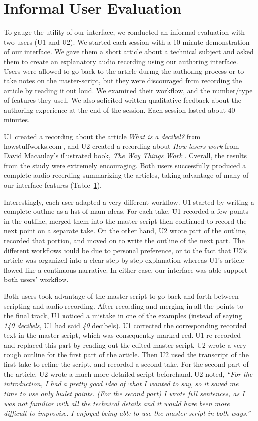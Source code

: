 \section{Informal User Evaluation}

To gauge the utility of our interface, we conducted an informal evaluation with two users (U1 and U2). We started each session with a 10-minute demonstration of our interface. We gave them a short article about a technical subject and asked them to create an explanatory audio recording using our authoring interface. Users were allowed to go back to the article during the authoring process or to take notes on the master-script, but they were discouraged from recording the article by reading it out loud. We examined their workflow, and the number/type of features they used. We also solicited written qualitative feedback about the authoring experience at the end of the session. Each session lasted about 40 minutes.

U1 created a recording about the article \textit{What is a decibel? } from howstuffworks.com \cite{}, and U2 created a recording about \textit{How lasers work} from David Macaulay's illustrated book, \textit{The Way Things Work} \cite{}. Overall, the results from the study were extremely encouraging. Both users successfully produced a complete audio recording summarizing the articles, taking advantage of many of our interface features (Table~\ref{}). 

Interestingly, each user adapted a very different workflow. U1 started by writing a complete outline as a list of main ideas. For each take, U1 recorded a few points in the outline, merged them into the master-script then continued to record the next point on a separate take. On the other hand, U2 wrote part of the outline, recorded that portion, and moved on to write the outline of the next part. The different workflows could be due to personal preference, or  to the fact that U2's article was organized into a clear step-by-step explanation whereas U1's article flowed like a continuous narrative. In either case, our interface was able support both users' workflow. 

Both users took advantage of the master-script to go back and forth between scripting and audio recording. After recording and merging in all the points
to the final track, U1 noticed a mistake in one of the examples
(instead of saying \textit{140 decibels}, U1 had said \textit{40}
decibels). U1 corrected the corresponding recorded text in the
master-script, which was consequently marked red. U1 re-recorded
and replaced this part by reading out the edited master-script.
U2 wrote a very rough outline for the first part of the article. Then U2 used the transcript of the first take to refine the script, and recorded a second take. For the second part of the article, U2 wrote a much more detailed script beforehand. U2 noted,  \textit{``For the introduction, I had a pretty good idea of what I wanted to say, so it saved me time to use only bullet points. (For the second part) I wrote full sentences, as I was not familiar with all the technical details and it would have been more difficult
to improvise. I enjoyed being able to use the master-script in both ways.''
}



